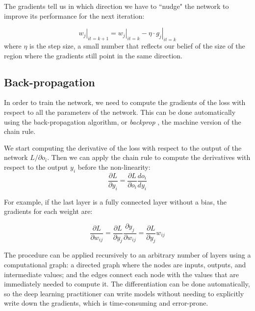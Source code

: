 The gradients tell us in which direction we have to ``nudge" the network to improve its performance for the next iteration:

\begin{equation*}
\left. w_j\right|_{it=k+1} = \left. w_j\right|_{it=k} - \eta \cdot \left. g_j\right|_{it=k}
\end{equation*}
where $\eta$ is the step size, a small number that reflects our belief of the size of the region where the gradients still point in the same direction.

\subsection{Back-propagation}
In order to train the network, we need to compute the gradients of the loss with respect to all the parameters of the network.
This can be done automatically using the back-propagation algorithm, or \emph{backprop} \citep{backprop}, the machine version of the chain rule.

We start computing the derivative of the loss with respect to the output of the network ${L}/{\partial o_i}$.
Then we can apply the chain rule to compute the derivatives with respect to the output $y_i$ before the non-linearity:
\begin{equation*}
\frac{\partial L}{\partial y_i} = \frac{\partial L}{\partial o_i} \frac{d o_i}{d y_i}
\end{equation*}

For example, if the last layer is a fully connected layer without a bias, the gradients for each weight are:

\begin{equation*}
\frac{\partial L}{\partial w_{ij}} = \frac{\partial L}{\partial y_j} \frac{\partial y_j}{\partial w_{ij}} =  \frac{\partial L}{\partial y_j}  w_{ij}
\end{equation*}

The procedure  can be applied recursively to an arbitrary number of layers using a computational graph: a directed graph where the nodes are inputs, outputs, and intermediate values; and the edges connect each node with the values that are immediately needed to compute it.
The differentiation can be done automatically, so the deep learning practitioner can write models without needing to explicitly write down the gradients, which is time-consuming and error-prone.


